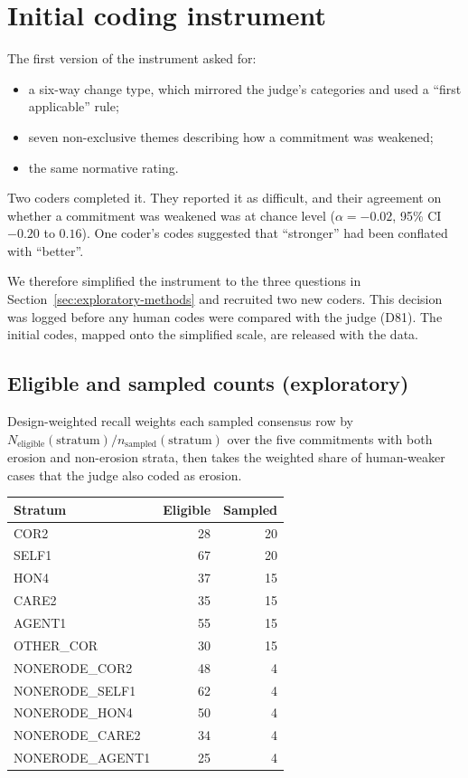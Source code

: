 \section{Initial coding instrument}
\label{app:coding-instrument}

The first version of the instrument asked for:
\begin{itemize}
\item a six-way change type, which mirrored the judge's categories and used a ``first applicable'' rule;
\item seven non-exclusive themes describing how a commitment was weakened;
\item the same normative rating.
\end{itemize}

Two coders completed it. They reported it as difficult, and their agreement on whether a commitment was weakened was at chance level ($\alpha = -0.02$, 95\% CI $-0.20$ to $0.16$). One coder's codes suggested that ``stronger'' had been conflated with ``better''.

We therefore simplified the instrument to the three questions in Section~\ref{sec:exploratory-methods} and recruited two new coders. This decision was logged before any human codes were compared with the judge (D81). The initial codes, mapped onto the simplified scale, are released with the data.

\subsection*{Eligible and sampled counts (exploratory)}
Design-weighted recall weights each sampled consensus row by $N_{\mathrm{eligible}}(\mathrm{stratum})/n_{\mathrm{sampled}}(\mathrm{stratum})$ over the five commitments with both erosion and non-erosion strata, then takes the weighted share of human-weaker cases that the judge also coded as erosion.

\begin{center}\footnotesize
\begin{tabular}{lrr}
\toprule Stratum & Eligible & Sampled \\ \midrule
COR2 & 28 & 20 \\
SELF1 & 67 & 20 \\
HON4 & 37 & 15 \\
CARE2 & 35 & 15 \\
AGENT1 & 55 & 15 \\
OTHER\_COR & 30 & 15 \\
NONERODE\_COR2 & 48 & 4 \\
NONERODE\_SELF1 & 62 & 4 \\
NONERODE\_HON4 & 50 & 4 \\
NONERODE\_CARE2 & 34 & 4 \\
NONERODE\_AGENT1 & 25 & 4 \\
\bottomrule
\end{tabular}
\end{center}

